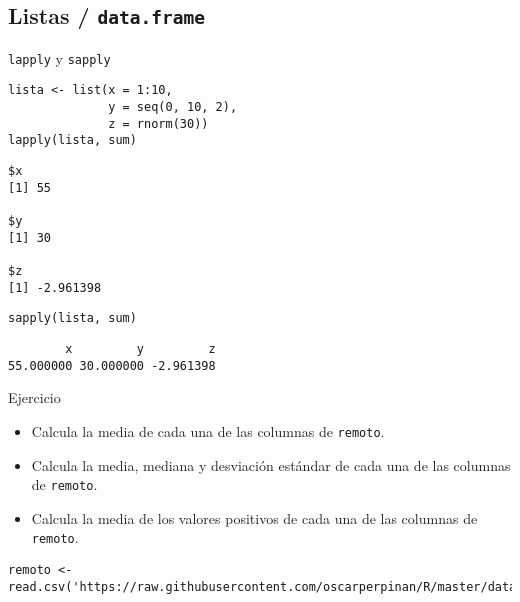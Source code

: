\documentclass[xcolor={usenames,svgnames,dvipsnames}]{beamer}
\begin{document}
\subsection{Listas / \texttt{data.frame}}
\label{sec:org41356b2}
\begin{frame}[fragile,label={sec:orga297592}]{\texttt{lapply} y \texttt{sapply}}
 \lstset{language=r,label= ,caption= ,captionpos=b,numbers=none}
\begin{lstlisting}
lista <- list(x = 1:10,
              y = seq(0, 10, 2),
              z = rnorm(30))
lapply(lista, sum)
\end{lstlisting}

\begin{verbatim}
$x
[1] 55

$y
[1] 30

$z
[1] -2.961398
\end{verbatim}

\lstset{language=r,label= ,caption= ,captionpos=b,numbers=none}
\begin{lstlisting}
sapply(lista, sum)
\end{lstlisting}

\begin{verbatim}
        x         y         z 
55.000000 30.000000 -2.961398
\end{verbatim}
\end{frame}

\begin{frame}[fragile,label={sec:org6978996}]{Ejercicio}
 \begin{block}{}
\begin{itemize}
\item Calcula la media de cada una de las columnas de \texttt{remoto}.
\item Calcula la media, mediana y desviación estándar de cada una de las columnas de \texttt{remoto}.
\item Calcula la media de los valores positivos de cada una de las columnas de \texttt{remoto}.
\end{itemize}
\end{block}

\begin{block}{}
\lstset{language=r,label= ,caption= ,captionpos=b,numbers=none}
\begin{lstlisting}
remoto <- read.csv('https://raw.githubusercontent.com/oscarperpinan/R/master/data/aranjuez.csv')
\end{lstlisting}
\end{block}
\end{frame}
\end{document}
